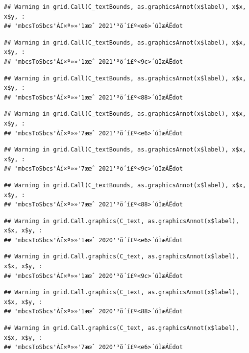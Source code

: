 \documentclass[
]{book}
\begin{document}
\begin{verbatim}
## Warning in grid.Call(C_textBounds, as.graphicsAnnot(x$label), x$x, x$y, :
## 'mbcsToSbcs'Àï×ª»»'1æœˆ 2021'³ö´í£º<e6>´úÌæÁËdot
\end{verbatim}

\begin{verbatim}
## Warning in grid.Call(C_textBounds, as.graphicsAnnot(x$label), x$x, x$y, :
## 'mbcsToSbcs'Àï×ª»»'1æœˆ 2021'³ö´í£º<9c>´úÌæÁËdot
\end{verbatim}

\begin{verbatim}
## Warning in grid.Call(C_textBounds, as.graphicsAnnot(x$label), x$x, x$y, :
## 'mbcsToSbcs'Àï×ª»»'1æœˆ 2021'³ö´í£º<88>´úÌæÁËdot
\end{verbatim}

\begin{verbatim}
## Warning in grid.Call(C_textBounds, as.graphicsAnnot(x$label), x$x, x$y, :
## 'mbcsToSbcs'Àï×ª»»'7æœˆ 2021'³ö´í£º<e6>´úÌæÁËdot
\end{verbatim}

\begin{verbatim}
## Warning in grid.Call(C_textBounds, as.graphicsAnnot(x$label), x$x, x$y, :
## 'mbcsToSbcs'Àï×ª»»'7æœˆ 2021'³ö´í£º<9c>´úÌæÁËdot
\end{verbatim}

\begin{verbatim}
## Warning in grid.Call(C_textBounds, as.graphicsAnnot(x$label), x$x, x$y, :
## 'mbcsToSbcs'Àï×ª»»'7æœˆ 2021'³ö´í£º<88>´úÌæÁËdot
\end{verbatim}

\begin{verbatim}
## Warning in grid.Call.graphics(C_text, as.graphicsAnnot(x$label), x$x, x$y, :
## 'mbcsToSbcs'Àï×ª»»'1æœˆ 2020'³ö´í£º<e6>´úÌæÁËdot
\end{verbatim}

\begin{verbatim}
## Warning in grid.Call.graphics(C_text, as.graphicsAnnot(x$label), x$x, x$y, :
## 'mbcsToSbcs'Àï×ª»»'1æœˆ 2020'³ö´í£º<9c>´úÌæÁËdot
\end{verbatim}

\begin{verbatim}
## Warning in grid.Call.graphics(C_text, as.graphicsAnnot(x$label), x$x, x$y, :
## 'mbcsToSbcs'Àï×ª»»'1æœˆ 2020'³ö´í£º<88>´úÌæÁËdot
\end{verbatim}

\begin{verbatim}
## Warning in grid.Call.graphics(C_text, as.graphicsAnnot(x$label), x$x, x$y, :
## 'mbcsToSbcs'Àï×ª»»'7æœˆ 2020'³ö´í£º<e6>´úÌæÁËdot
\end{verbatim}
\end{document}
